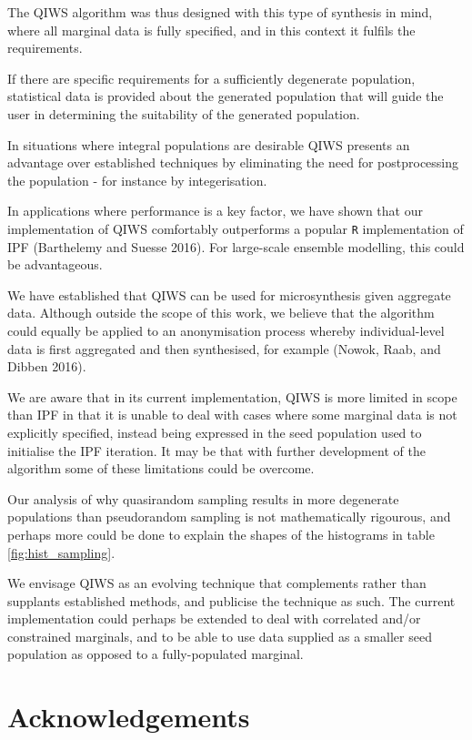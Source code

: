 \documentclass{JASSS}
\begin{document}
The QIWS algorithm was thus designed with this type of synthesis in
mind, where all marginal data is fully specified, and in this context it
fulfils the requirements.

If there are specific requirements for a sufficiently degenerate population,
statistical data is provided about the generated population that will
guide the user in determining the suitability of the generated
population.

In situations where integral populations are desirable QIWS presents an
advantage over established techniques by eliminating the need for
postprocessing the population - for instance by integerisation.

In applications where performance is a key factor, we have shown that
our implementation of QIWS comfortably outperforms a popular \texttt{R}
implementation of IPF (Barthelemy and Suesse 2016). For large-scale
ensemble modelling, this could be advantageous.

We have established that QIWS can be used for microsynthesis given
aggregate data. Although outside the scope of this work, we believe that
the algorithm could equally be applied to an anonymisation process
whereby individual-level data is first aggregated and then synthesised,
for example (Nowok, Raab, and Dibben 2016).

We are aware that in its current implementation, QIWS is more limited in scope than IPF in that it is
unable to deal with cases where some marginal data is not explicitly
specified, instead being expressed in the seed population used to
initialise the IPF iteration. It may be that with further development of
the algorithm some of these limitations could be overcome.

Our analysis of why quasirandom sampling results in more degenerate populations than pseudorandom sampling is not mathematically rigourous, and perhaps more could be done to explain the shapes of the histograms in table \ref{fig:hist_sampling}.

We envisage QIWS as an evolving technique that complements rather than
supplants established methods, and publicise the technique as such. The current implementation could perhaps be extended to deal with correlated and/or constrained marginals, and to be able to use data supplied as a smaller seed population as opposed to a fully-populated marginal.

\section{Acknowledgements}\label{acknowledgements}
\end{document}

